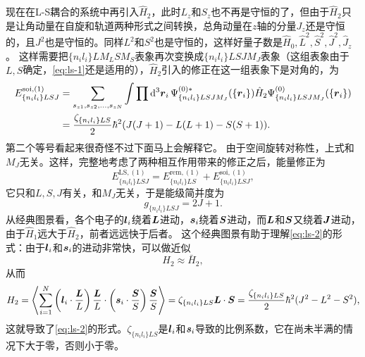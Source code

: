 \documentclass[UTF8, a4paper]{ctexart}
\begin{document}
现在在L-S耦合的系统中再引入$\hat{H}_2$，此时$L_z$和$S_z$也不再是守恒的了，但由于$\hat{H}_2$只是让角动量在自旋和轨道两种形式之间转换，总角动量在$z$轴的分量$J_z$还是守恒的，且$J^2$也是守恒的。同样$L^2$和$S^2$也是守恒的，这样好量子数是$\hat{H}_0, \hat{L}^2, \hat{S}^2, \hat{J}^2, \hat{J}_z$。
这样需要把$\{n_i l_i\} L M_L S M_S$表象再次变换成$\{n_i l_i\} L S J M_J$表象（这组表象由于$L,S$确定，\eqref{eq:ls-1}还是适用的），$\hat{H}_2$引入的修正在这一组表象下是对角的，为
\begin{equation}
    \begin{aligned}
        E^{\text{soi}, (1)}_{\{n_i l_i\} LSJ} &= \sum_{s_{z1}, s_{z2}, \ldots, s_{zN}} \int \prod \dd[3]{\vb*{r}_i} \Psi^{(0) *}_{\{n_i l_i\} L S J M_J}(\{\vb*{r}_i\}) \hat{H}_2 \Psi^{(0)}_{\{n_i l_i\} L S J M_J}(\{\vb*{r}_i\}) \\
        &= \frac{\zeta_{\{n_i l_i\}LS}}{2} \hbar^2 (J(J+1) - L(L+1) - S(S+1)).
        \label{eq:ls-2}
    \end{aligned}
\end{equation}
第二个等号看起来很奇怪不过下面马上会解释它。
由于空间旋转对称性，上式和$M_J$无关。这样，完整地考虑了两种相互作用带来的修正之后，能量修正为
\begin{equation}
    E^{\text{LS}, (1)}_{\{n_i l_i\} LSJ} = E^{\text{rem}, (1)}_{\{n_i l_i\} LS} + E^{\text{soi}, (1)}_{\{n_i l_i\} LSJ},
\end{equation}
它只和$L,S,J$有关，和$M_J$无关，于是能级简并度为
\begin{equation}
    g_{\{n_i l_i\}LSJ} = 2J + 1.
\end{equation}
从经典图景看，各个电子的$\vb*{l}_i$绕着$\vb*{L}$进动，$\vb*{s}_i$绕着$\vb*{S}$进动，而$\vb*{L}$和$\vb*{S}$又绕着$\vb*{J}$进动，由于$\hat{H}_1$远大于$\hat{H}_2$，前者远远快于后者。
这个经典图景有助于理解\eqref{eq:ls-2}的形式：由于$\vb*{l}_i$和$\vb*{s}_i$的进动非常快，可以做近似
\[
    H_2 \approx \bar{H}_2,
\]
从而
\[
    H_2 = \expval{\sum_{i=1}^N \left(\vb*{l}_i \cdot \frac{\vb*{L}}{L} \right) \frac{\vb*{L}}{L} \cdot \left(\vb*{s}_i \cdot \frac{\vb*{S}}{S} \right) \frac{\vb*{S}}{S} } = \zeta_{\{n_i l_i\}LS} \vb*{L} \cdot \vb*{S} = \frac{\zeta_{\{n_i l_i\}LS}}{2} \hbar^2 (J^2 - L^2 - S^2),
\]
这就导致了\eqref{eq:ls-2}的形式。$\zeta_{\{n_i l_i\}LS}$是$\vb*{l}_i$和$\vb*{s}_i$导致的比例系数，它在尚未半满的情况下大于零，否则小于零。
\end{document}
